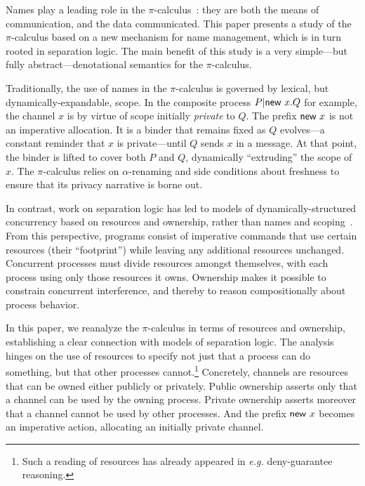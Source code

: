 \documentclass{entcs}
\begin{document}
\newcommand{\trip}[3]{\{#1\}\ #2\ \{#3\}}

\newcommand{\Pf}[1]{\textsf{Pf} [ #1 ] }

\newcommand{\leftlist}[1]{
  \left\{
  \begin{array}{l}
    #1
  \end{array}
  \right.
}
 
Names play a leading role in the $\pi$-calculus~\cite{Milner1992}:
they are both the means of communication, and the data communicated.
This paper presents a study of the $\pi$-calculus based on a new
mechanism for name management, which is in turn rooted in separation
logic.  The main benefit of this study is a very simple---but fully
abstract---denotational semantics for the $\pi$-calculus.

Traditionally, the use of names in the $\pi$-calculus is governed by
lexical, but dynamically-expandable, scope.  In the composite process
$P | \textsf{new } x. Q$ for example, the channel $x$ is by virtue of scope
initially \emph{private} to $Q$.  The prefix $\textsf{new } x$ is not an
imperative allocation.  It is a binder that remains fixed as $Q$
evolves---a constant reminder that $x$ is private---until $Q$ sends
$x$ in a message.  At that point, the binder is lifted to cover both
$P$ and $Q$, dynamically ``extruding'' the scope of $x$.  The
$\pi$-calculus relies on $\alpha$-renaming and side conditions about
freshness to ensure that its privacy narrative is borne out.





In contrast, work on separation logic has led to models of
dynamically-structured concurrency based on resources and ownership,
rather than names and scoping~\cite{Brookes2007,Calcagno2007}.  From
this perspective, programs consist of imperative commands that use
certain resources (their ``footprint'') while leaving any additional
resources unchanged.  Concurrent processes must divide resources
amongst themselves, with each process using only those resources it
owns.  Ownership makes it possible to constrain concurrent
interference, and thereby to reason compositionally about process
behavior.

In this paper, we reanalyze the $\pi$-calculus in terms of resources
and ownership, establishing a clear connection with models of
separation logic.  The analysis hinges on the use of resources to
specify not just that a process can do something, but that other
processes cannot.\footnote{ Such a reading of resources has already
  appeared in \emph{e.g.} deny-guarantee reasoning\cite{Dodds2009}.  }
Concretely, channels are resources that can be owned either publicly
or privately.  Public ownership asserts only that a channel can be
used by the owning process.  Private ownership asserts moreover that a
channel cannot be used by other processes.  And the prefix $\textsf{new } x$
becomes an imperative action, allocating an initially private
channel.
\end{document}
